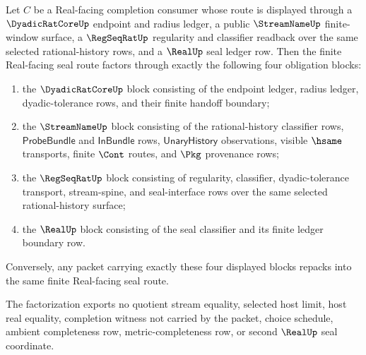 \begin{theorem}
\label{thm:streamname-regseq-real-four-face-obligation-factorization}
Let $C$ be a Real-facing completion consumer whose route is displayed through
a $\DyadicRatCoreUp$ endpoint and radius ledger, a public $\StreamNameUp$
finite-window surface, a $\RegSeqRatUp$ regularity and classifier readback over
the same selected rational-history rows, and a $\RealUp$ seal ledger row. Then
the finite Real-facing seal route factors through exactly the following four
obligation blocks:
\begin{enumerate}
  \item the $\DyadicRatCoreUp$ block consisting of the endpoint ledger,
  radius ledger, dyadic-tolerance rows, and their finite handoff boundary;
  \item the $\StreamNameUp$ block consisting of the rational-history
  classifier rows, $\mathsf{ProbeBundle}$ and $\mathsf{InBundle}$ rows,
  $\mathsf{UnaryHistory}$ observations, visible $\hsame$ transports, finite
  $\Cont$ routes, and $\Pkg$ provenance rows;
  \item the $\RegSeqRatUp$ block consisting of regularity, classifier,
  dyadic-tolerance transport, stream-spine, and seal-interface rows over the
  same selected rational-history surface;
  \item the $\RealUp$ block consisting of the seal classifier and its finite
  ledger boundary row.
\end{enumerate}
Conversely, any packet carrying exactly these four displayed blocks repacks
into the same finite Real-facing seal route.

The factorization exports no quotient stream equality, selected host limit,
host real equality, completion witness not carried by the packet, choice
schedule, ambient completeness row, metric-completeness row, or second
$\RealUp$ seal coordinate.
\end{theorem}
